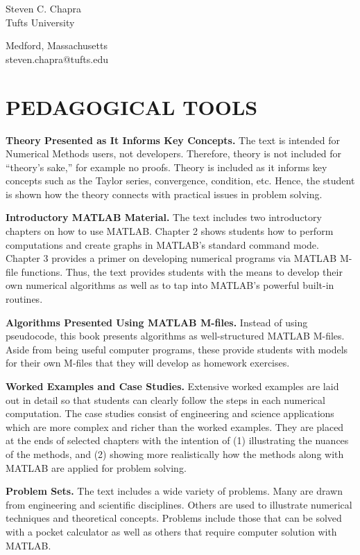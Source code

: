\documentclass[../main.tex]{subfiles}
\begin{document}
\begin{flushright}
Steven C. Chapra\\
Tufts University



Medford, Massachusetts\\
steven.chapra@tufts.edu\\
\end{flushright}

\section*{PEDAGOGICAL TOOLS}
\label{sec:sec_P_1_1}


\textbf{Theory Presented as It Informs Key Concepts.} The text is intended for Numerical Methods users, not developers. Therefore, theory is not included for “theory’s sake,” for example no
proofs. Theory is included as it informs key concepts such as the Taylor series, convergence,
condition, etc. Hence, the student is shown how the theory connects with practical issues in
problem solving.


\textbf{Introductory MATLAB Material.} The text includes two introductory chapters on how to
use MATLAB. Chapter 2 shows students how to perform computations and create graphs
in MATLAB’s standard command mode. Chapter 3 provides a primer on developing
numerical programs via MATLAB M-file functions. Thus, the text provides students with
the means to develop their own numerical algorithms as well as to tap into MATLAB’s
powerful built-in routines.

\textbf{Algorithms Presented Using MATLAB M-files.} Instead of using pseudocode, this book
presents algorithms as well-structured MATLAB M-files. Aside from being useful computer programs, these provide students with models for their own M-files that they will
develop as homework exercises.

\textbf{Worked Examples and Case Studies.} Extensive worked examples are laid out in detail
so that students can clearly follow the steps in each numerical computation. The case studies consist of engineering and science applications which are more complex and richer than
the worked examples. They are placed at the ends of selected chapters with the intention of
(1) illustrating the nuances of the methods, and (2) showing more realistically how the
methods along with MATLAB are applied for problem solving.

\textbf{Problem Sets.} The text includes a wide variety of problems. Many are drawn from engineering and scientific disciplines. Others are used to illustrate numerical techniques and
theoretical concepts. Problems include those that can be solved with a pocket calculator as
well as others that require computer solution with MATLAB.
\end{document}
